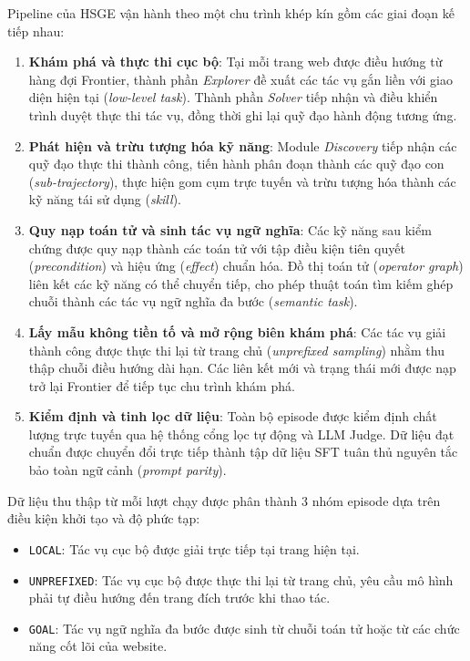 Pipeline của HSGE vận hành theo một chu trình khép kín gồm các giai đoạn kế tiếp nhau:
\begin{enumerate}
  \item \textbf{Khám phá và thực thi cục bộ}: Tại mỗi trang web được điều hướng từ hàng đợi Frontier, thành phần \textit{Explorer} đề xuất các tác vụ gắn liền với giao diện hiện tại (\textit{low-level task}). Thành phần \textit{Solver} tiếp nhận và điều khiển trình duyệt thực thi tác vụ, đồng thời ghi lại quỹ đạo hành động tương ứng.
  \item \textbf{Phát hiện và trừu tượng hóa kỹ năng}: Module \textit{Discovery} tiếp nhận các quỹ đạo thực thi thành công, tiến hành phân đoạn thành các quỹ đạo con (\textit{sub-trajectory}), thực hiện gom cụm trực tuyến và trừu tượng hóa thành các kỹ năng tái sử dụng (\textit{skill}).
  \item \textbf{Quy nạp toán tử và sinh tác vụ ngữ nghĩa}: Các kỹ năng sau kiểm chứng được quy nạp thành các toán tử với tập điều kiện tiên quyết (\textit{precondition}) và hiệu ứng (\textit{effect}) chuẩn hóa. Đồ thị toán tử (\textit{operator graph}) liên kết các kỹ năng có thể chuyển tiếp, cho phép thuật toán tìm kiếm ghép chuỗi thành các tác vụ ngữ nghĩa đa bước (\textit{semantic task}).
  \item \textbf{Lấy mẫu không tiền tố và mở rộng biên khám phá}: Các tác vụ giải thành công được thực thi lại từ trang chủ (\textit{unprefixed sampling}) nhằm thu thập chuỗi điều hướng dài hạn. Các liên kết mới và trạng thái mới được nạp trở lại Frontier để tiếp tục chu trình khám phá.
  \item \textbf{Kiểm định và tinh lọc dữ liệu}: Toàn bộ episode được kiểm định chất lượng trực tuyến qua hệ thống cổng lọc tự động và LLM Judge. Dữ liệu đạt chuẩn được chuyển đổi trực tiếp thành tập dữ liệu SFT tuân thủ nguyên tắc bảo toàn ngữ cảnh (\textit{prompt parity}).
\end{enumerate}

Dữ liệu thu thập từ mỗi lượt chạy được phân thành 3 nhóm episode dựa trên điều kiện khởi tạo và độ phức tạp:
\begin{itemize}
  \item \texttt{LOCAL}: Tác vụ cục bộ được giải trực tiếp tại trang hiện tại.
  \item \texttt{UNPREFIXED}: Tác vụ cục bộ được thực thi lại từ trang chủ, yêu cầu mô hình phải tự điều hướng đến trang đích trước khi thao tác.
  \item \texttt{GOAL}: Tác vụ ngữ nghĩa đa bước được sinh từ chuỗi toán tử hoặc từ các chức năng cốt lõi của website.
\end{itemize}

